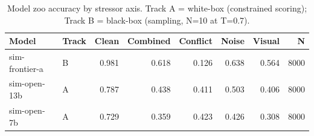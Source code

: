 \begin{table}[t]
\centering
\small
\begin{tabular}{llrrrrrr}
\toprule
Model & Track & Clean & Combined & Conflict & Noise & Visual & N \\
\midrule
sim-frontier-a & B & 0.981 & 0.618 & 0.126 & 0.638 & 0.564 & 8000 \\
sim-open-13b & A & 0.787 & 0.438 & 0.411 & 0.503 & 0.406 & 8000 \\
sim-open-7b & A & 0.729 & 0.359 & 0.423 & 0.426 & 0.308 & 8000 \\
\bottomrule
\end{tabular}
\caption{Model zoo accuracy by stressor axis. Track A = white-box (constrained scoring); Track B = black-box (sampling, N=10 at T=0.7).}
\end{table}
